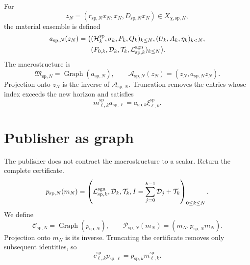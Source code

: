 For
\[
 z_N=(r_{\mathrm{sp},N}x_N,x_N,D_{\mathrm{sp},N}x_N)
 \in X_{\chi,\mathrm{sp},N},
\]
the material ensemble is defined
\begin{equation}
\label{eq:continuo-sp-a-accion}
\begin{aligned}
 a_{\mathrm{sp},N}(z_N)=\bigl(&
 (\mathcal H_k^{\mathrm{sp}},\sigma_k,P_k,Q_k)_{k\leq N},
 (U_k,A_k,\eta_k)_{k<N},\\
 &(F_{0,k},\mathcal D_k,\mathcal T_k,
   \mathcal L^{\rm sgn}_{\mathrm{sp},k})_{k\leq N}\bigr).
\end{aligned}
\end{equation}
The macrostructure is
\begin{equation}
\label{eq:continuo-sp-m-graph}
 \mathfrak M_{\mathrm{sp},N}
 =\operatorname{Graph}(a_{\mathrm{sp},N}),
 \qquad
 \mathcal A_{\mathrm{sp},N}(z_N)
 =(z_N,a_{\mathrm{sp},N}z_N).
\end{equation}
Projection onto \(z_N\) is the inverse of
\(\mathcal A_{\mathrm{sp},N}\). Truncation removes the entries whose
index exceeds the new horizon and satisfies
\begin{equation}
\label{eq:continuo-sp-a-naturalidad}
 m^{\mathrm{sp}}_{\ell,k}a_{\mathrm{sp},\ell}
 =a_{\mathrm{sp},k}\xi^{\mathrm{sp}}_{\ell,k}.
\end{equation}

\section{Publisher as graph}

The publisher does not contract the macrostructure to a scalar. Return the
complete certificate.
\begin{equation}
\label{eq:continuo-sp-p-accion}
 p_{\mathrm{sp},N}(m_N)
 =\left(
 \mathcal L^{\rm sgn}_{\mathrm{sp},k},
 \mathcal D_k,
 \mathcal T_k,
 I=\sum_{j=0}^{k-1}\mathcal D_j+\mathcal T_k
 \right)_{0\leq k\leq N}.
\end{equation}
We define
\begin{equation}
\label{eq:continuo-sp-c-graph}
 \mathcal C_{\mathrm{sp},N}
 =\operatorname{Graph}(p_{\mathrm{sp},N}),
 \qquad
 \mathcal P_{\mathrm{sp},N}(m_N)
 =(m_N,p_{\mathrm{sp},N}m_N).
\end{equation}
Projection onto \(m_N\) is its inverse. Truncating the certificate removes only
subsequent identities, so
\begin{equation}
\label{eq:continuo-sp-p-naturalidad}
 c^{\mathrm{sp}}_{\ell,k}p_{\mathrm{sp},\ell}
 =p_{\mathrm{sp},k}m^{\mathrm{sp}}_{\ell,k}.
\end{equation}

